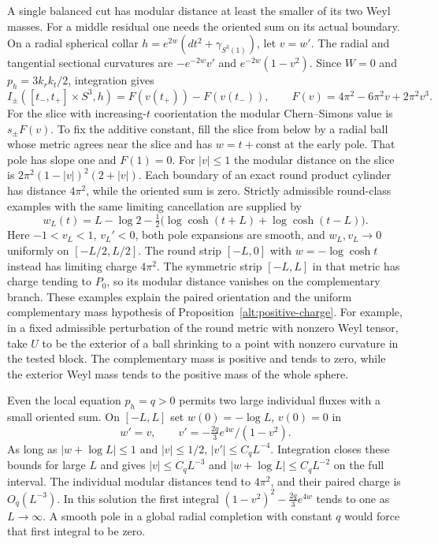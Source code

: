 A single balanced cut has modular distance at least the smaller of
its two Weyl masses. For a middle residual one needs the oriented
sum on its actual boundary. On a radial spherical collar
\(h=e^{2w}(dt^2+\gamma_{S^3(1)})\), let \(v=w'\).
The radial and tangential sectional curvatures are
\(-e^{-2w}v'\) and \(e^{-2w}(1-v^2)\). Since \(W=0\) and
\(p_h=3k_rk_t/2\), integration gives
\[
 I_\pm([t_-,t_+]\times S^3,h)=F(v(t_+))-F(v(t_-)),\qquad
 F(v)=4\pi^2-6\pi^2v+2\pi^2v^3.
\]
For the slice with increasing-\(t\) coorientation the modular
Chern--Simons value is \(s_\pm F(v)\). To fix the additive
constant, fill the slice from below by a radial ball whose metric
agrees near the slice and has \(w=t+\mathrm{const}\) at the
early pole. That pole has slope one and \(F(1)=0\).
For \(|v|\le1\) the modular distance on the slice is
\(2\pi^2(1-|v|)^2(2+|v|)\). Each boundary of an exact round
product cylinder has distance \(4\pi^2\), while the oriented
sum is zero. Strictly admissible round-class examples with
the same limiting cancellation are supplied by
\[
 w_L(t)=L-\log 2-\tfrac12\bigl(\log\cosh(t+L)+\log\cosh(t-L)\bigr).
\]
Here \(-1<v_L<1\), \(v_L'<0\), both pole expansions are smooth,
and \(w_L,v_L\to0\) uniformly on \([-L/2,L/2]\). The round
strip \([-L,0]\) with \(w=-\log\cosh t\) instead has limiting
charge \(4\pi^2\). The symmetric strip \([-L,L]\) in that
metric has charge tending to \(P_0\), so its modular distance
vanishes on the complementary branch. These examples explain
the paired orientation and the uniform complementary mass
hypothesis of Proposition~\ref{alt:positive-charge}.
For example, in a fixed admissible perturbation of the round
metric with nonzero Weyl tensor, take \(U\) to be the exterior
of a ball shrinking to a point with nonzero curvature in the
tested block. The complementary mass is positive and tends to
zero, while the exterior Weyl mass tends to the positive mass
of the whole sphere.

Even the local equation \(p_h=q>0\) permits two large individual
fluxes with a small oriented sum. On \([-L,L]\) set
\(w(0)=-\log L\), \(v(0)=0\) in
\[
 w'=v,\qquad v'=-\tfrac{2q}{3}e^{4w}/(1-v^2).
\]
As long as \(|w+\log L|\le1\) and \(|v|\le1/2\),
\(|v'|\le C_q L^{-4}\). Integration closes these bounds for
large \(L\) and gives \(|v|\le C_qL^{-3}\) and
\(|w+\log L|\le C_qL^{-2}\) on the full interval.
The individual modular distances tend to \(4\pi^2\), and their
paired charge is \(O_q(L^{-3})\). In this solution the first
integral \((1-v^2)^2-\tfrac{2q}{3}e^{4w}\) tends to one as
\(L\to\infty\). A smooth pole in a global radial completion
with constant \(q\) would force that first integral to be zero.

